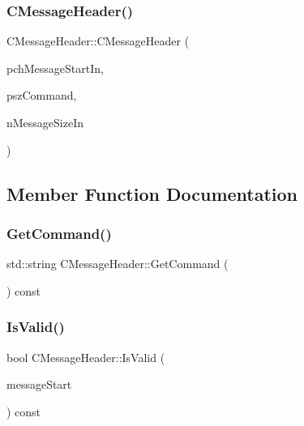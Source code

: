 \mbox{\label{class_c_message_header_a169f178657c1e3621f16adeeae44bc3a}} 
\subsubsection{\texorpdfstring{C\+Message\+Header()}{CMessageHeader()}\hspace{0.1cm}{\footnotesize\ttfamily [2/2]}}
{\footnotesize\ttfamily C\+Message\+Header\+::\+C\+Message\+Header (\begin{DoxyParamCaption}\item[{const \mbox{\hyperlink{class_c_message_header_a0d0eeb540cbf4087973f6652ad61878f}{Message\+Start\+Chars}} \&}]{pch\+Message\+Start\+In,  }\item[{const char $\ast$}]{psz\+Command,  }\item[{unsigned int}]{n\+Message\+Size\+In }\end{DoxyParamCaption})}



\subsection{Member Function Documentation}
\mbox{\label{class_c_message_header_ab5b3807481d4b918527b86523f1efee2}} 
\subsubsection{\texorpdfstring{Get\+Command()}{GetCommand()}}
{\footnotesize\ttfamily std\+::string C\+Message\+Header\+::\+Get\+Command (\begin{DoxyParamCaption}{ }\end{DoxyParamCaption}) const}

\mbox{\label{class_c_message_header_a759db7100358ba4a44bf6dee757ffe51}} 
\subsubsection{\texorpdfstring{Is\+Valid()}{IsValid()}}
{\footnotesize\ttfamily bool C\+Message\+Header\+::\+Is\+Valid (\begin{DoxyParamCaption}\item[{const \mbox{\hyperlink{class_c_message_header_a0d0eeb540cbf4087973f6652ad61878f}{Message\+Start\+Chars}} \&}]{message\+Start }\end{DoxyParamCaption}) const}

